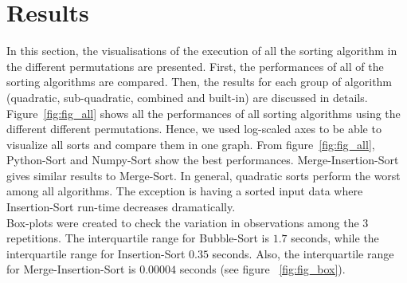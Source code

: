 \documentclass[sigconf, nonacm, natbib, screen, balance=False]{acmart}
\begin{document}
\section{Results}\label{sec:results}
In this section, the visualisations of the execution of all the sorting algorithm in the different permutations are presented. First, the performances of all of the sorting algorithms are compared. Then, the results for each group of algorithm (quadratic, sub-quadratic, combined and built-in) are discussed in details. Figure~\ref{fig:fig_all} shows all the performances of all sorting algorithms using the different different permutations. Hence, we used log-scaled axes to be able to visualize all sorts and compare them in one graph. From figure~\ref{fig:fig_all}, Python-Sort and Numpy-Sort show the best performances. Merge-Insertion-Sort gives similar results to Merge-Sort. In general, quadratic sorts perform the worst among all algorithms. The exception is having a sorted input data where Insertion-Sort run-time decreases dramatically.
\hfill\\
Box-plots were created to check the variation in observations among the $3$ repetitions. The interquartile range for Bubble-Sort is $1.7$ seconds, while the interquartile range for Insertion-Sort $0.35$ seconds. Also, the interquartile range for Merge-Insertion-Sort is $0.00004$ seconds (see figure ~\ref{fig:fig_box}).
\end{document}
